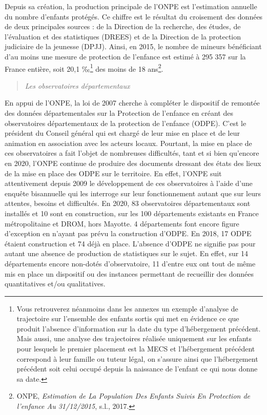 \documentclass[
  12,
  a4paper,
]{report}
\begin{document}
Depuis sa création, la production principale de l'ONPE est l'estimation
annuelle du nombre d'enfants protégés. Ce chiffre est le résultat du
croisement des données de deux principales sources : de la Direction de
la recherche, des études, de l'évaluation et des statistiques (DREES) et
de la Direction de la protection judiciaire de la jeunesse (DPJJ).
Ainsi, en 2015, le nombre de mineurs bénéficiant d'au moins une mesure
de protection de l'enfance est estimé à 295 357 sur la France entière,
soit 20,1 ‰\footnote{Vous retrouverez néanmoins dans les annexes un
  exemple d'analyse de trajectoire sur l'ensemble des enfants sortis qui
  met en évidence ce que produit l'absence d'information sur la date du
  type d'hébergement précédent. Mais aussi, une analyse des trajectoires
  réalisée uniquement sur les enfants pour lesquels le premier placement
  est la MECS et l'hébergement précédent correspond à leur famille ou
  tuteur légal, on s'assure ainsi que l'hébergement précédent soit celui
  occupé depuis la naissance de l'enfant ce qui nous donne sa date.} des
moins de 18 ans\footnote{ONPE, \emph{Estimation de La Population Des
  Enfants Suivis En Protection de l'enfance Au 31/12/2015}, s.l., 2017.}.

\begin{quote}
\emph{Les observatoires départementaux}
\end{quote}

En appui de l'ONPE, la loi de 2007 cherche à compléter le dispositif de
remontée des données départementales sur la Protection de l'enfance en
créant des observatoires départementaux de la protection de l'enfance
(ODPE). C'est le président du Conseil général qui est chargé de leur
mise en place et de leur animation en association avec les acteurs
locaux. Pourtant, la mise en place de ces observatoires a fait l'objet
de nombreuses difficultés, tant et si bien qu'encore en 2020, l'ONPE
continue de produire des documents dressant des états des lieux de la
mise en place des ODPE sur le territoire. En effet, l'ONPE suit
attentivement depuis 2009 le développement de ces observatoires à l'aide
d'une enquête bisannuelle qui les interroge sur leur fonctionnement
autant que sur leurs attentes, besoins et difficultés. En 2020, 83
observatoires départementaux sont installés et 10 sont en construction,
sur les 100 départements existants en France métropolitaine et DROM,
hors Mayotte. 4 départements font encore figure d'exception en n'ayant
pas prévu la construction d'ODPE. En 2018, 17 ODPE étaient construction
et 74 déjà en place. L'absence d'ODPE ne signifie pas pour autant une
absence de production de statistiques sur le sujet. En effet, sur 14
départements encore non-dotés d'observatoire, 11 d'entre eux ont tout de
même mis en place un dispositif ou des instances permettant de
recueillir des données quantitatives et/ou qualitatives.
\end{document}
